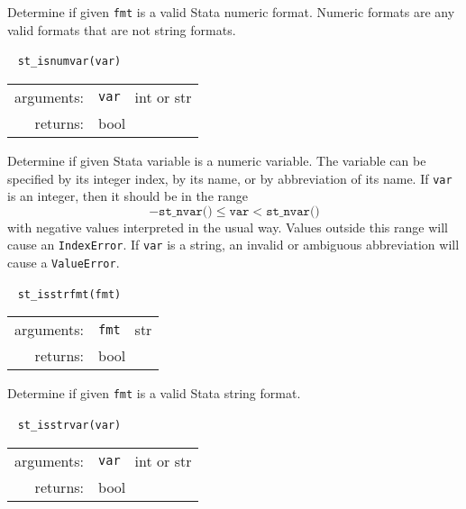 \documentclass{article}
\begin{document}
			\vspace{1.5mm}
			\noindent Determine if given \lstinline{fmt} is a valid Stata numeric format. Numeric formats are any valid formats that are not string formats. \newline
			
			
			\ \newline
			\noindent \lstinline$st_isnumvar(var)$
								
			\vspace{1.5mm}
			\noindent 
			\indent \begin{tabular}{rrl}
					arguments: & \texttt{var} & int or str \\
					returns: & \multicolumn{2}{l}{bool}
				\end{tabular}
								
			\vspace{1.5mm}
			\noindent Determine if given Stata variable is a numeric variable. The variable can be specified by its integer index, by its name, or by abbreviation of its name. If \lstinline{var} is an integer, then it should be in the range
			\[
				-\texttt{st\_nvar()} \leq \texttt{var} < \texttt{st\_nvar()}
			\]
			with negative values interpreted in the usual way. Values outside this range will cause an \lstinline{IndexError}. If \lstinline{var} is a string, an invalid or ambiguous abbreviation will cause a \lstinline{ValueError}. \newline
			
			
			\ \newline
			\noindent \lstinline$st_isstrfmt(fmt)$
								
			\vspace{1.5mm}
			\noindent 
			\indent \begin{tabular}{rrl}
					arguments: & \texttt{fmt} & str \\
					returns: & \multicolumn{2}{l}{bool}
				\end{tabular}
								
			\vspace{1.5mm}
			\noindent Determine if given \lstinline{fmt} is a valid Stata string format. \newline
			
						
			\ \newline
			\noindent \lstinline$st_isstrvar(var)$
								
			\vspace{1.5mm}
			\noindent 
			\indent \begin{tabular}{rrl}
					arguments: & \texttt{var} & int or str \\
					returns: & \multicolumn{2}{l}{bool}
				\end{tabular}
								
\end{document}
